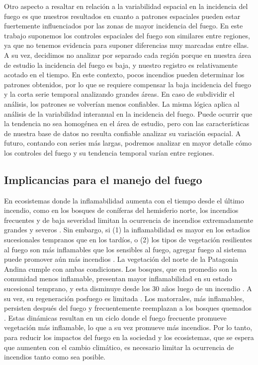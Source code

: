 Otro aspecto a resaltar en relación a la variabilidad espacial en la incidencia del fuego es que nuestros resultados en cuanto a patrones espaciales pueden estar fuertemente influenciados por las zonas de mayor incidencia del fuego. En este trabajo suponemos los controles espaciales del fuego son similares entre regiones, ya que no tenemos evidencia para suponer diferencias muy marcadas entre ellas. A su vez, decidimos no analizar por separado cada región porque en nuestra área de estudio la incidencia del fuego es baja, y nuestro registro es relativamente acotado en el tiempo. En este contexto, pocos incendios pueden determinar los patrones obtenidos, por lo que se requiere compensar la baja incidencia del fuego y la corta serie temporal analizando grandes áreas. En caso de subdividir el análisis, los patrones se volverían menos confiables. La misma lógica aplica al análisis de la variabilidad interanual en la incidencia del fuego. Puede ocurrir que la tendencia no sea homogénea en el área de estudio, pero con las características de nuestra base de datos no resulta confiable analizar su variación espacial. A futuro, contando con series más largas, podremos analizar en mayor detalle cómo los controles del fuego y su tendencia temporal varían entre regiones.

\subsection{Implicancias para el manejo del fuego}

En ecosistemas donde la inflamabilidad aumenta con el tiempo desde el último incendio, como en los bosques de coníferas del hemisferio norte, los incendios frecuentes y de baja severidad limitan la ocurrencia de incendios extremadamente grandes y severos \citep{ryan_prescribed_2013}. Sin embargo, si (1) la inflamabilidad es mayor en los estadios sucesionales tempranos que en los tardíos, o (2) los tipos de vegetación resilientes al fuego son más inflamables que los sensibles al fuego, agregar fuego al sistema puede promover aún más incendios \citep{kitzberger_decreases_2012, tiribelli_non-additive_2019}. La vegetación del norte de la Patagonia Andina cumple con ambas condiciones. Los bosques, que en promedio son la comunidad menos inflamable, presentan mayor inflamabilidad en su estado sucesional temprano, y esta disminuye desde los 30 años luego de un incendio \citep{tiribelli_changes_2018, tiribelli_non-additive_2019, barbera_microclimate_2023}. A su vez, su regeneración posfuego es limitada \citep{cuevas_tree_2000, kitzberger_effects_2005, tercero-bucardo_field_2007, landesmann_importance_2018}. Los matorrales, más inflamables, persisten después del fuego y frecuentemente reemplazan a los bosques quemados \citep{kitzberger_firevegetation_2016, landesmann_increased_2021}. Estas dinámicas resultan en un ciclo donde el fuego frecuente promueve vegetación más inflamable, lo que a su vez promueve más incendios. Por lo tanto, para reducir los impactos del fuego en la sociedad y los ecosistemas, que se espera que aumenten con el cambio climático, es necesario limitar la ocurrencia de incendios tanto como sea posible.

